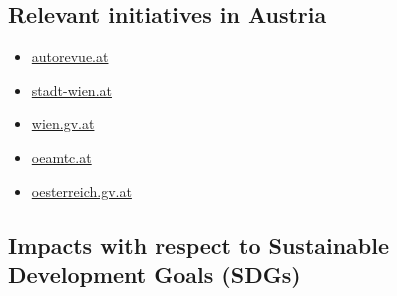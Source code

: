 \documentclass[
]{book}
\providecommand{\tightlist}{%
  \setlength{\itemsep}{0pt}\setlength{\parskip}{0pt}}
\begin{document}
\hypertarget{relevant-initiatives-in-austria-44}{%
\subsection*{Relevant initiatives in Austria}\label{relevant-initiatives-in-austria-44}}

\begin{itemize}
\tightlist
\item
  \href{https://autorevue.at/ratgeber/e-scooter-wien-vergleich}{autorevue.at}
\item
  \href{https://www.stadt-wien.at/wien/news/e-scooter-sharing-system-in-wien.html}{stadt-wien.at}
\item
  \href{https://www.wien.gv.at/verkehr/scooter-roller/index.html}{wien.gv.at}
\item
  \href{https://www.oeamtc.at/thema/fahrrad/e-kleintretroller-e-scooter-in-oesterreich-31721872}{oeamtc.at}
\item
  \href{https://www.oesterreich.gv.at/themen/freizeit_und_strassenverkehr/Elektro-Scooter,-Quads-und-Co/Seite.610110.html}{oesterreich.gv.at}
\end{itemize}

\hypertarget{impacts-with-respect-to-sustainable-development-goals-sdgs-44}{%
\subsection*{Impacts with respect to Sustainable Development Goals (SDGs)}\label{impacts-with-respect-to-sustainable-development-goals-sdgs-44}}
\end{document}

